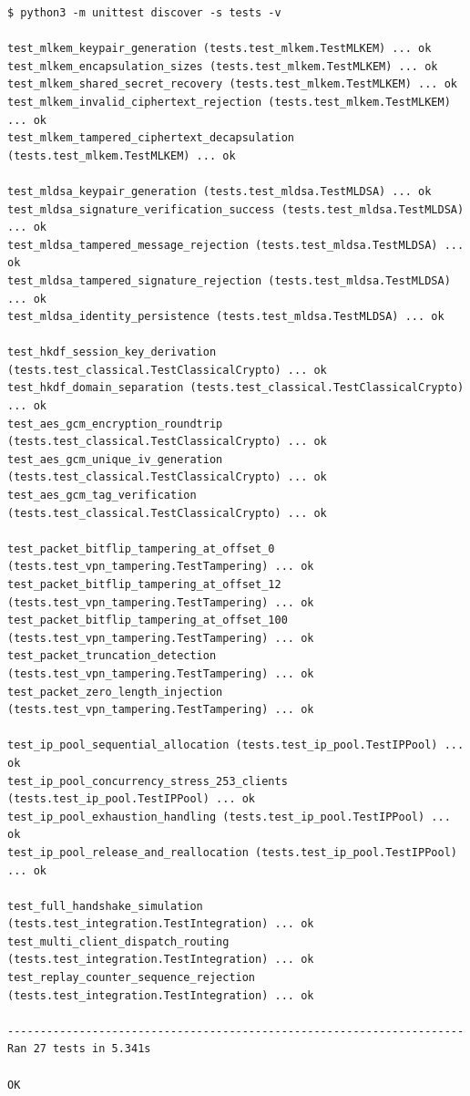 \begin{lstlisting}[basicstyle=\ttfamily\scriptsize, caption={Complete Console Output from Automated Python Test Suites.}]
$ python3 -m unittest discover -s tests -v

test_mlkem_keypair_generation (tests.test_mlkem.TestMLKEM) ... ok
test_mlkem_encapsulation_sizes (tests.test_mlkem.TestMLKEM) ... ok
test_mlkem_shared_secret_recovery (tests.test_mlkem.TestMLKEM) ... ok
test_mlkem_invalid_ciphertext_rejection (tests.test_mlkem.TestMLKEM) ... ok
test_mlkem_tampered_ciphertext_decapsulation (tests.test_mlkem.TestMLKEM) ... ok

test_mldsa_keypair_generation (tests.test_mldsa.TestMLDSA) ... ok
test_mldsa_signature_verification_success (tests.test_mldsa.TestMLDSA) ... ok
test_mldsa_tampered_message_rejection (tests.test_mldsa.TestMLDSA) ... ok
test_mldsa_tampered_signature_rejection (tests.test_mldsa.TestMLDSA) ... ok
test_mldsa_identity_persistence (tests.test_mldsa.TestMLDSA) ... ok

test_hkdf_session_key_derivation (tests.test_classical.TestClassicalCrypto) ... ok
test_hkdf_domain_separation (tests.test_classical.TestClassicalCrypto) ... ok
test_aes_gcm_encryption_roundtrip (tests.test_classical.TestClassicalCrypto) ... ok
test_aes_gcm_unique_iv_generation (tests.test_classical.TestClassicalCrypto) ... ok
test_aes_gcm_tag_verification (tests.test_classical.TestClassicalCrypto) ... ok

test_packet_bitflip_tampering_at_offset_0 (tests.test_vpn_tampering.TestTampering) ... ok
test_packet_bitflip_tampering_at_offset_12 (tests.test_vpn_tampering.TestTampering) ... ok
test_packet_bitflip_tampering_at_offset_100 (tests.test_vpn_tampering.TestTampering) ... ok
test_packet_truncation_detection (tests.test_vpn_tampering.TestTampering) ... ok
test_packet_zero_length_injection (tests.test_vpn_tampering.TestTampering) ... ok

test_ip_pool_sequential_allocation (tests.test_ip_pool.TestIPPool) ... ok
test_ip_pool_concurrency_stress_253_clients (tests.test_ip_pool.TestIPPool) ... ok
test_ip_pool_exhaustion_handling (tests.test_ip_pool.TestIPPool) ... ok
test_ip_pool_release_and_reallocation (tests.test_ip_pool.TestIPPool) ... ok

test_full_handshake_simulation (tests.test_integration.TestIntegration) ... ok
test_multi_client_dispatch_routing (tests.test_integration.TestIntegration) ... ok
test_replay_counter_sequence_rejection (tests.test_integration.TestIntegration) ... ok

----------------------------------------------------------------------
Ran 27 tests in 5.341s

OK
\end{lstlisting}

